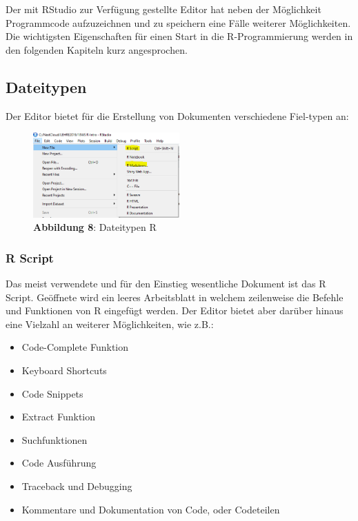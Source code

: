 \documentclass[]{article}
\providecommand{\tightlist}{%
  \setlength{\itemsep}{0pt}\setlength{\parskip}{0pt}}
\begin{document}
Der mit RStudio zur Verfügung gestellte Editor hat neben der Möglichkeit
Programmcode aufzuzeichnen und zu speichern eine Fälle weiterer
Möglichkeiten. Die wichtigsten Eigenschaften für einen Start in die
R-Programmierung werden in den folgenden Kapiteln kurz angesprochen.

\subsection*{Dateitypen}\label{dateitypen}

Der Editor bietet für die Erstellung von Dokumenten verschiedene
Fiel-typen an:

\begin{figure}
\centering
\includegraphics[width=0.50000\textwidth]{Images/03_R_File_Types.PNG}
\caption{\textbf{Abbildung 8}: Dateitypen R}
\end{figure}

\subsubsection*{R Script}\label{r-script}

Das meist verwendete und für den Einstieg wesentliche Dokument ist das R
Script. Geöffnete wird ein leeres Arbeitsblatt in welchem zeilenweise
die Befehle und Funktionen von R eingefügt werden. Der Editor bietet
aber darüber hinaus eine Vielzahl an weiterer Möglichkeiten, wie z.B.:

\begin{itemize}
\tightlist
\item
  Code-Complete Funktion
\item
  Keyboard Shortcuts
\item
  Code Snippets
\item
  Extract Funktion
\item
  Suchfunktionen
\item
  Code Ausführung
\item
  Traceback und Debugging
\item
  Kommentare und Dokumentation von Code, oder Codeteilen
\end{itemize}
\end{document}
